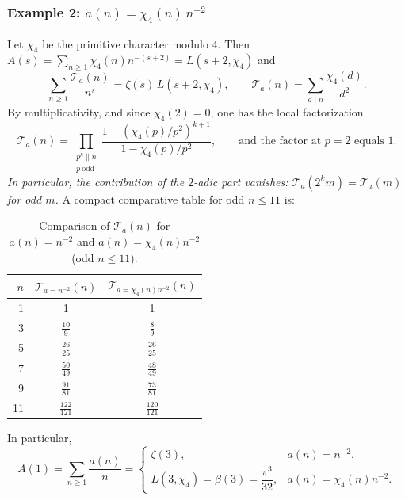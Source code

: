 \subsubsection*{Example 2: $a(n)=\chi_4(n)\,n^{-2}$}
Let $\chi_4$ be the primitive character modulo $4$. Then $A(s)=\sum_{n\ge1}\chi_4(n)n^{-(s+2)}=L(s+2,\chi_4)$ and
\[
\sum_{n\ge1}\frac{\mathcal{T}_a(n)}{n^{s}}=\zeta(s)\,L(s+2,\chi_4),\qquad
\mathcal{T}_a(n)=\sum_{d\mid n}\frac{\chi_4(d)}{d^{2}}.
\]
By multiplicativity, and since $\chi_4(2)=0$, one has the local factorization
\[
\mathcal{T}_a(n)=\prod_{\substack{p^k\parallel n\\ p\ \mathrm{odd}}}\frac{1-(\chi_4(p)/p^{2})^{k+1}}{1-\chi_4(p)/p^{2}},
\qquad\text{and the factor at }p=2\text{ equals }1.
\]
\emph{In particular, the contribution of the $2$-adic part vanishes: $\mathcal{T}_a(2^k m)=\mathcal{T}_a(m)$ for odd $m$.}
A compact comparative table for odd $n\le 11$ is:
\begin{table}[h]
\centering
\caption{Comparison of $\mathcal{T}_a(n)$ for $a(n)=n^{-2}$ and $a(n)=\chi_4(n)n^{-2}$ (odd $n\le 11$).}
\begin{tabular}{r c c}
\toprule
$n$ & $\mathcal{T}_{a=n^{-2}}(n)$ & $\mathcal{T}_{a=\chi_4(n)n^{-2}}(n)$\\
\midrule
1 & 1 & 1 \\
3 & \(\frac{10}{9}\) & \(\frac{8}{9}\) \\
5 & \(\frac{26}{25}\) & \(\frac{26}{25}\) \\
7 & \(\frac{50}{49}\) & \(\frac{48}{49}\) \\
9 & \(\frac{91}{81}\) & \(\frac{73}{81}\) \\
11 & \(\frac{122}{121}\) & \(\frac{120}{121}\) \\
\bottomrule
\end{tabular}
\end{table}


\noindent In particular,
\[
A(1)=\sum_{n\ge1}\frac{a(n)}{n}=
\begin{cases}
\zeta(3), & a(n)=n^{-2},\\[3pt]
L(3,\chi_4)=\beta(3)=\dfrac{\pi^{3}}{32}, & a(n)=\chi_4(n)n^{-2}.
\end{cases}
\]



